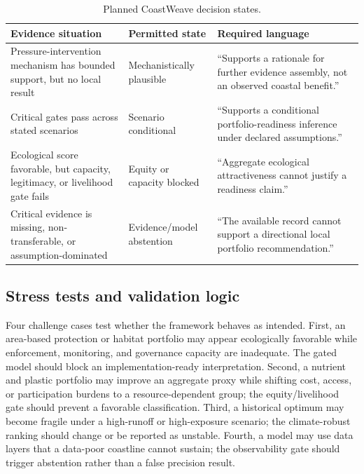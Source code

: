 \documentclass[conference]{IEEEtran}
\begin{document}
\begin{table}[t]
\caption{Planned CoastWeave decision states.}
\label{tab:states}
\centering
\scriptsize
\renewcommand{\arraystretch}{1.1}
\begin{tabular}{|p{}|p{}|p{}|}
\hline
\textbf{Evidence situation} & \textbf{Permitted state} & \textbf{Required language} \\
\hline
Pressure-intervention mechanism has bounded support, but no local result & Mechanistically plausible & ``Supports a rationale for further evidence assembly, not an observed coastal benefit.'' \\
\hline
Critical gates pass across stated scenarios & Scenario conditional & ``Supports a conditional portfolio-readiness inference under declared assumptions.'' \\
\hline
Ecological score favorable, but capacity, legitimacy, or livelihood gate fails & Equity or capacity blocked & ``Aggregate ecological attractiveness cannot justify a readiness claim.'' \\
\hline
Critical evidence is missing, non-transferable, or assumption-dominated & Evidence/model abstention & ``The available record cannot support a directional local portfolio recommendation.'' \\
\hline
\end{tabular}
\end{table}

\subsection{Stress tests and validation logic}

Four challenge cases test whether the framework behaves as intended. First, an area-based protection or habitat portfolio may appear ecologically favorable while enforcement, monitoring, and governance capacity are inadequate. The gated model should block an implementation-ready interpretation. Second, a nutrient and plastic portfolio may improve an aggregate proxy while shifting cost, access, or participation burdens to a resource-dependent group; the equity/livelihood gate should prevent a favorable classification. Third, a historical optimum may become fragile under a high-runoff or high-exposure scenario; the climate-robust ranking should change or be reported as unstable. Fourth, a model may use data layers that a data-poor coastline cannot sustain; the observability gate should trigger abstention rather than a false precision result.
\end{document}

